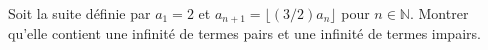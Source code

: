 Soit la suite définie par $a_1 = 2$ et $a_{n+1} = \lfloor (3/2)a_n \rfloor$ pour $n \in \mathbb{N}$. Montrer qu'elle contient une infinité de termes pairs et une infinité de termes impairs.
